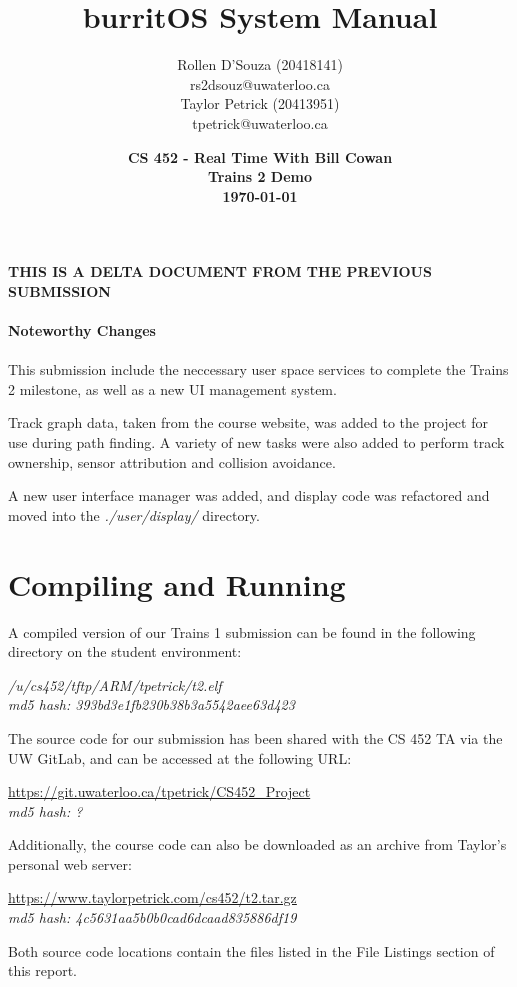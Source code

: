 \documentclass[twoside,a4paper]{refart}
\title{burritOS System Manual}
\author{Rollen D'Souza (20418141) \\
rs2dsouz@uwaterloo.ca \\
Taylor Petrick (20413951) \\
tpetrick@uwaterloo.ca \\}
\date{\textbf{CS 452 - Real Time With Bill Cowan \\ Trains 2 Demo \\ \today}}
\begin{document}
\maketitle


\textbf{THIS IS A DELTA DOCUMENT FROM THE PREVIOUS SUBMISSION}\\\\
\textbf{Noteworthy Changes}\\\\
This submission include the neccessary user space services to complete the Trains 2 milestone, as well as a new UI management system.

Track graph data, taken from the course website, was added to the project for use during path finding. A variety of new tasks were also added to perform track ownership, sensor attribution and collision avoidance.

A new user interface manager was added, and display code was refactored and moved into the \textit{./user/display/} directory.

\newpage


\section{Compiling and Running}
A compiled version of our Trains 1 submission can be found in the following directory on the student environment:
\begin{center}
\textit{/u/cs452/tftp/ARM/tpetrick/t2.elf}\\
\textit{md5 hash: 393bd3e1fb230b38b3a5542aee63d423}
\end{center}
The source code for our submission has been shared with the CS 452 TA via the UW GitLab, and can be accessed at the following URL:
\begin{center}
\url{https://git.uwaterloo.ca/tpetrick/CS452_Project}\\
\textit{md5 hash: ?}
\end{center}
Additionally, the course code can also be downloaded as an archive from Taylor’s personal web server:
\begin{center}
\url{https://www.taylorpetrick.com/cs452/t2.tar.gz}\\
\textit{md5 hash: 4c5631aa5b0b0cad6dcaad835886df19}
\end{center}
Both source code locations contain the files listed in the File Listings section of this report.
\end{document}
